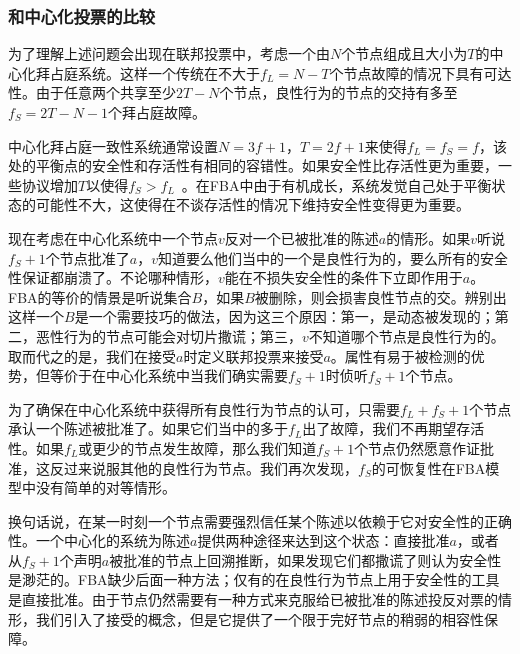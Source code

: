 \subsubsection{和中心化投票的比较}

为了理解上述问题会出现在联邦投票中，考虑一个由$N$个节点组成且{\quorum}大小为$T$的中心化拜占庭系统。这样一个传统在不大于$f_L=N-T$个节点故障的情况下具有{\quorum}可达性。由于任意两个{\quorum}共享至少$2T-N$个节点，良性行为的节点的{\quorum}交持有多至$f_S=2T-N-1$个拜占庭故障。

中心化拜占庭一致性系统通常设置$N=3f+1$，$T=2f+1$来使得$f_L=f_S=f$，该处的平衡点的安全性和存活性有相同的容错性。如果安全性比存活性更为重要，一些协议增加$T$以使得$f_S>f_L$~\cite{Li:2007:BOF:1973430.1973440}。在FBA中由于{\quorum}有机成长，系统发觉自己处于平衡状态的可能性不大，这使得在不谈存活性的情况下维持安全性变得更为重要。

现在考虑在中心化系统中一个节点$v$反对一个已被批准的陈述$a$的情形。如果$v$听说$f_S+1$个节点批准了$a$，$v$知道要么他们当中的一个是良性行为的，要么所有的安全性保证都崩溃了。不论哪种情形，$v$能在不损失安全性的条件下立即作用于$a$。FBA的等价的情景是听说集合$B$，如果$B$被删除，则会损害良性节点的{\quorum}交。辨别出这样一个$B$是一个需要技巧的做法，因为这三个原因：第一，{\quorum}是动态被发现的；第二，恶性行为的节点可能会对切片撒谎；第三，$v$不知道哪个节点是良性行为的。取而代之的是，我们在{\vblock}接受$a$时定义联邦投票来接受$a$。{\vblock}属性有易于被检测的优势，但等价于在中心化系统中当我们确实需要$f_S+1$时侦听$f_S+1$个节点。


为了确保在中心化系统中获得所有良性行为节点的认可，只需要$f_L+f_S+1$个节点承认一个陈述被批准了。如果它们当中的多于$f_L$出了故障，我们不再期望存活性。如果$f_L$或更少的节点发生故障，那么我们知道$f_S+1$个节点仍然愿意作证批准，这反过来说服其他的良性行为节点。我们再次发现，$f_S$的可恢复性在FBA模型中没有简单的对等情形。

换句话说，在某一时刻一个节点需要强烈信任某个陈述以依赖于它对安全性的正确性。一个中心化的系统为陈述$a$提供两种途径来达到这个状态：直接批准$a$，或者从$f_S+1$个声明$a$被批准的节点上回溯推断，如果发现它们都撒谎了则认为安全性是渺茫的。FBA缺少后面一种方法；仅有的在良性行为节点上用于安全性的工具是直接批准。由于节点仍然需要有一种方式来克服给已被批准的陈述投反对票的情形，我们引入了接受的概念，但是它提供了一个限于完好节点的稍弱的相容性保障。
